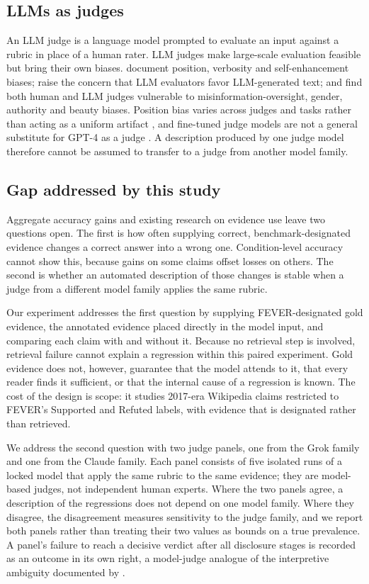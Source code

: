\subsection{LLMs as judges}
An LLM judge is a language model prompted to evaluate an input against a rubric in place of a human rater.
LLM judges make large-scale evaluation feasible but bring their own biases.
\citet{zheng2023judging} document position, verbosity and self-enhancement biases; \citet{liu-etal-2023-g} raise the concern that LLM evaluators favor LLM-generated text; and \citet{chen-etal-2024-humans} find both human and LLM judges vulnerable to misinformation-oversight, gender, authority and beauty biases.
Position bias varies across judges and tasks rather than acting as a uniform artifact \citep{shi-etal-2025-judging}, and fine-tuned judge models are not a general substitute for GPT-4 as a judge \citep{huang-etal-2025-empirical}.
A description produced by one judge model therefore cannot be assumed to transfer to a judge from another model family.

\subsection{Gap addressed by this study}
Aggregate accuracy gains and existing research on evidence use leave two questions open.
The first is how often supplying correct, benchmark-designated evidence changes a correct answer into a wrong one.
Condition-level accuracy cannot show this, because gains on some claims offset losses on others.
The second is whether an automated description of those changes is stable when a judge from a different model family applies the same rubric.

Our experiment addresses the first question by supplying FEVER-designated gold evidence, the annotated evidence placed directly in the model input, and comparing each claim with and without it.
Because no retrieval step is involved, retrieval failure cannot explain a regression within this paired experiment.
Gold evidence does not, however, guarantee that the model attends to it, that every reader finds it sufficient, or that the internal cause of a regression is known.
The cost of the design is scope: it studies 2017-era Wikipedia claims restricted to FEVER's Supported and Refuted labels, with evidence that is designated rather than retrieved.

We address the second question with two judge panels, one from the Grok family and one from the Claude family.
Each panel consists of five isolated runs of a locked model that apply the same rubric to the same evidence; they are model-based judges, not independent human experts.
Where the two panels agree, a description of the regressions does not depend on one model family.
Where they disagree, the disagreement measures sensitivity to the judge family, and we report both panels rather than treating their two values as bounds on a true prevalence.
A panel's failure to reach a decisive verdict after all disclosure stages is recorded as an outcome in its own right, a model-judge analogue of the interpretive ambiguity documented by \citet{glockner-etal-2024-ambifc}.
